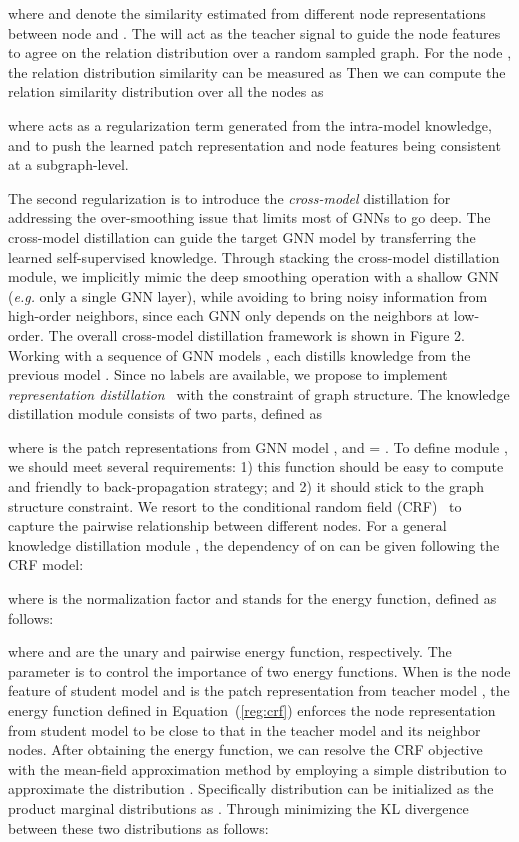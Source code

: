 \documentclass[preprint]{article}
\begin{document}
where  and  denote the similarity estimated from different node representations between node  and . The  will act as the teacher signal to guide the node features  to agree on the relation distribution over a random sampled graph. For the node , the relation distribution similarity can be measured as 
Then we can compute the relation similarity distribution over all the nodes as 

where  acts as a regularization term generated from the intra-model knowledge, and    to push the learned patch representation  and node features  being consistent at a subgraph-level. 

The second regularization is to introduce the \emph{cross-model} distillation for addressing the over-smoothing issue that limits most of GNNs to go deep. The cross-model distillation can guide the target GNN model by transferring the learned self-supervised knowledge. Through stacking the cross-model distillation module, we implicitly mimic the deep smoothing operation with a shallow GNN (\emph{e.g.} only a single GNN layer), while avoiding to bring noisy information from high-order neighbors, since each GNN only depends on the neighbors at low-order. The overall cross-model distillation framework is shown in Figure 2. Working with a sequence of  GNN models ,   each    distills knowledge from the previous  model . Since no labels are available, we propose to implement \emph{representation distillation}~\cite{tian2019contrastive} with the constraint of graph structure. The knowledge distillation module consists of two parts, defined as

where  is the patch representations from GNN model , and  = . To define    module , we should meet several requirements: 1) this function should be easy to compute and friendly to back-propagation strategy; and 2) it should stick to  the graph structure constraint. We resort to the conditional random field (CRF)~\cite{lafferty2001conditional} to capture the pairwise relationship between different nodes. 
For a general      knowledge distillation  module , the dependency of  on  can be given following the CRF model:

where  is the normalization factor and  stands for the energy function, defined as follows:

where  and  are the unary and pairwise energy function, respectively. The parameter  is to control the importance of two energy  functions.
When  is the node feature of student model and  is the patch representation from teacher model ,  the energy function defined in Equation~(\ref{reg:crf})    enforces the node  representation from student model to be close to that in the teacher model and its neighbor nodes. After obtaining the energy function, we can resolve the CRF objective with the mean-field approximation method by employing a simple distribution  to approximate the distribution . Specifically distribution  can be initialized as the product marginal distributions as . Through minimizing the KL divergence between these two distributions as follows:
\end{document}
